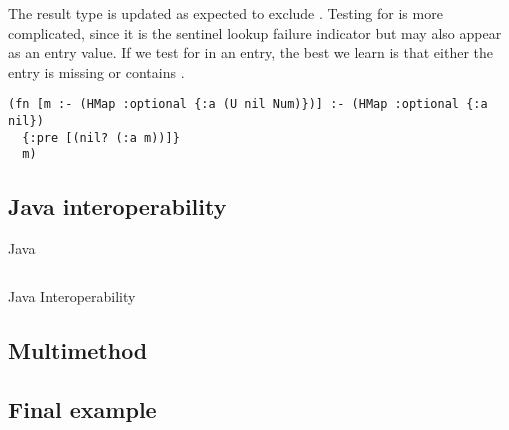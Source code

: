 The result type is updated as expected to exclude .
Testing for  is more complicated, since it is the sentinel
lookup failure indicator but may also appear as an entry value.
If we test for  in an  entry, the best we learn
is that either the entry is missing or contains .

\begin{verbatim}
(fn [m :- (HMap :optional {:a (U nil Num)})] :- (HMap :optional {:a nil})
  {:pre [(nil? (:a m))]}
  m)
\end{verbatim}





\subsection{Java interoperability}

Java

\begin{listing}
\inputminted[firstline=5,lastline=14]{clojure}{code/demo/src/demo/hmap.clj}
\caption{Java Interoperability}
\end{listing}


\subsection{Multimethod}

\subsection{Final example}

\inputminted[firstline=4]{clojure}{code/demo/src/demo/eg2.clj}
\inputminted[firstline=4]{clojure}{code/demo/src/demo/eg3.clj}
\inputminted[firstline=4]{clojure}{code/demo/src/demo/eg4.clj}
\inputminted[firstline=4,lastline=15]{clojure}{code/demo/src/demo/eg5.clj}
\inputminted[firstline=4,lastline=15]{clojure}{code/demo/src/demo/eg6.clj}
\inputminted[firstline=6,lastline=23]{clojure}{code/demo/src/demo/eg7.clj}











